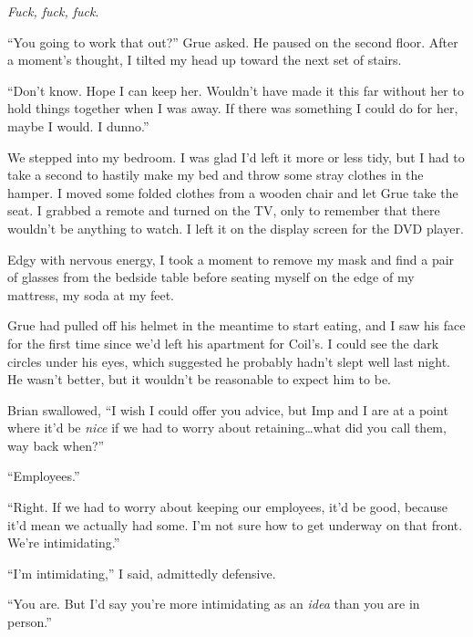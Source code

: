 \emph{Fuck, fuck, fuck}.



``You going to work that out?'' Grue asked.  He paused on the second floor.  After a moment's thought, I tilted my head up toward the next set of stairs.



``Don't know.  Hope I can keep her.  Wouldn't have made it this far without her to hold things together when I was away.  If there was something I could do for her, maybe I would.  I dunno.''



We stepped into my bedroom.  I was glad I'd left it more or less tidy, but I had to take a second to hastily make my bed and throw some stray clothes in the hamper.  I moved some folded clothes from a wooden chair and let Grue take the seat.  I grabbed a remote and turned on the TV, only to remember that there wouldn't be anything to watch.  I left it on the display screen for the DVD player.



Edgy with nervous energy, I took a moment to remove my mask and find a pair of glasses from the bedside table before seating myself on the edge of my mattress, my soda at my feet.



Grue had pulled off his helmet in the meantime to start eating, and I saw his face for the first time since we'd left his apartment for Coil's.  I could see the dark circles under his eyes, which suggested he probably hadn't slept well last night.  He wasn't better, but it wouldn't be reasonable to expect him to be.



Brian swallowed, ``I wish I could offer you advice, but Imp and I are at a point where it'd be \emph{nice} if we had to worry about retaining\ldots what did you call them, way back when?''



``Employees.''



``Right.  If we had to worry about keeping our employees, it'd be good, because it'd mean we actually had some.  I'm not sure how to get underway on that front.  We're intimidating.''



``I'm intimidating,'' I said, admittedly defensive.



``You are.  But I'd say you're more intimidating as an \emph{idea }than you are in person.''



